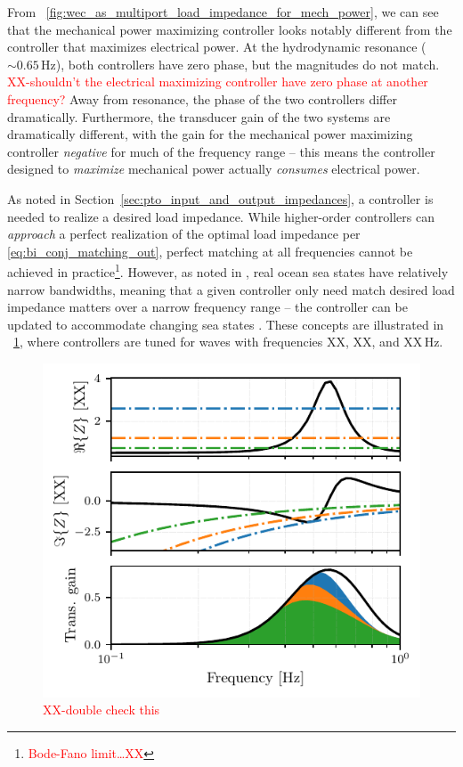 \documentclass[lettersize,journal]{IEEEtran}
\newcommand{\rc}[1]{\textcolor{red}{#1}}
\begin{document}
\noindent{}From \figurename~\ref{fig:wec_as_multiport_load_impedance_for_mech_power}, we can see that the mechanical power maximizing controller looks notably different from the controller that maximizes electrical power.
At the hydrodynamic resonance ($\sim 0.65$\,Hz), both controllers have zero phase, but the magnitudes do not match.
\rc{XX-shouldn't the electrical maximizing controller have zero phase at another frequency?}
Away from resonance, the phase of the two controllers differ dramatically.
Furthermore, the transducer gain of the two systems are dramatically different, with the gain for the mechanical power maximizing controller \emph{negative} for much of the frequency range -- this means the controller designed to \emph{maximize} mechanical power actually \emph{consumes} electrical power.

As noted in Section~\ref{sec:pto_input_and_output_impedances}, a controller is needed to realize a desired load impedance.
While higher-order controllers can \emph{approach} a perfect realization of the optimal load impedance per \eqref{eq:bi_conj_matching_out}, perfect matching at all frequencies cannot be achieved in practice\footnote{\rc{Bode-Fano limit\dots{}XX}}.
However, as noted in \cite{Coe2020a}, real ocean sea states have relatively narrow bandwidths, meaning that a given controller only need match desired load impedance matters over a narrow frequency range -- the controller can be updated to accommodate changing sea states \cite{Forbush:2022aa}.
These concepts are illustrated in \figurename~\ref{fig:gfx/wec_as_multiport_pi_controllers_real_imag}, where controllers are tuned for waves with frequencies XX, XX, and XX\,Hz.

\begin{figure}[tb]
        \centering
        \includegraphics[width=1\columnwidth]{wec_as_multiport_pi_controllers_real_imag.pdf}
        \caption{\rc{XX-double check this}}
        \label{fig:gfx/wec_as_multiport_pi_controllers_real_imag}
\end{figure}
\end{document}
